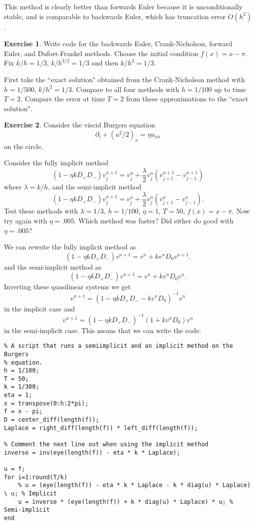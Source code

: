 \documentclass[10pt]{article}
\theoremstyle{definition}
\newtheorem{exer}{Exercise}
\begin{document}
This method is clearly better than forwards Euler because it is unconditionally stable, and is comparable to backwards Euler, which has truncation error $O(h^2)$.

\begin{exer}
Write code for the backwards Euler, Crank-Nicholson, forward Euler, and Dufort-Frankel methods.
Choose the initial condition $f(x) = x - \pi$.
Fix $k/h = 1/3$, $k/h^{3/2} = 1/3$ and then $k/h^2 = 1/3$.

First take the ``exact solution" obtained from the Crank-Nicholson method with $h = 1/500$, $k/h^2 = 1/3$.
Compare to all four methods with $h = 1/100$ up to time $T = 2$.
Compare the error at time $T = 2$ from these approximations to the ``exact solution".
\end{exer}



\begin{exer}
Consider the viscid Burgers equation
$$\partial_t + (u^2/2)_x = \eta u_{xx}$$
on the circle.

Consider the fully implicit method
$$(1 - \eta k D_+ D_-) v_j^{n + 1} = v_j^n + \frac{\lambda}{2} v_j^n(v_{j+1}^{n+1} - v_{j-1}^{n+1})$$
where $\lambda = k/h$, and the semi-implicit method
$$(1 - \eta k D_+ D_-) v_j^{n + 1} = v_j^n + \frac{\lambda}{2} v_j^n(v_{j+1}^n - v_{j-1}^n).$$
Test these methods with $\lambda = 1/3$, $h = 1/100$, $\eta = 1$, $T = 50$, $f(x) = x - \pi$.
Now try again with $\eta = .005$.
Which method was faster? Did either do good with $\eta = .005$?
\end{exer}

We can rewrite the fully implicit method as
$$(1 - \eta k D_+ D_-) v^{n + 1} = v^n + k v^n D_0 v^{n+1}.$$
and the semi-implicit method as
$$(1 - \eta k D_+ D_-) v^{n + 1} = v^n + k v^n D_0 v^n.$$
Inverting these quasilinear systems we get
$$v^{n + 1} = (1 - \eta k D_+ D_- - k v^n D_0)^{-1} v^n$$
in the implicit case and
$$v^{n + 1} = (1 - \eta k D_+ D_-)^{-1}(1 + kv^n D_0) v^n$$
in the semi-implicit case.
This means that we can write the code:

\begin{verbatim}
% A script that runs a semiimplicit and an implicit method on the Burgers
% equation.
h = 1/100;
T = 50;
k = 1/300;
eta = 1;
x = transpose(0:h:2*pi);
f = x - pi;
D = center_diff(length(f));
Laplace = right_diff(length(f)) * left_diff(length(f));

% Comment the next line out when using the implicit method
inverse = inv(eye(length(f)) - eta * k * Laplace);

u = f;
for i=1:round(T/k)
    % u = (eye(length(f)) - eta * k * Laplace - k * diag(u) * Laplace) \ u; % Implicit
    u = inverse * (eye(length(f)) + k * diag(u) * Laplace) * u; % Semi-implicit
end
\end{verbatim}
\end{document}
